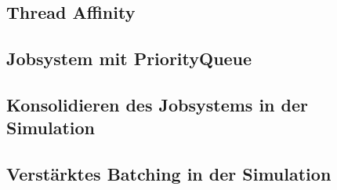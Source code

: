 \documentclass[12pt,a4paper,listof=totocnumbered,parskip=half,numbers=noendperiod]{scrartcl}
\begin{document}
\subsection{Thread Affinity}
\subsection{Jobsystem mit PriorityQueue}
\subsection{Konsolidieren des Jobsystems in der Simulation}
\subsection{Verstärktes Batching in der Simulation}
\printnoidxglossaries

\printbibliography[title={Literaturverzeichnis},heading=bibintoc,notkeyword=online]

\printbibliography[title={Quellenverzeichnis},heading=bibintoc,keyword=online] 


\end{document}
